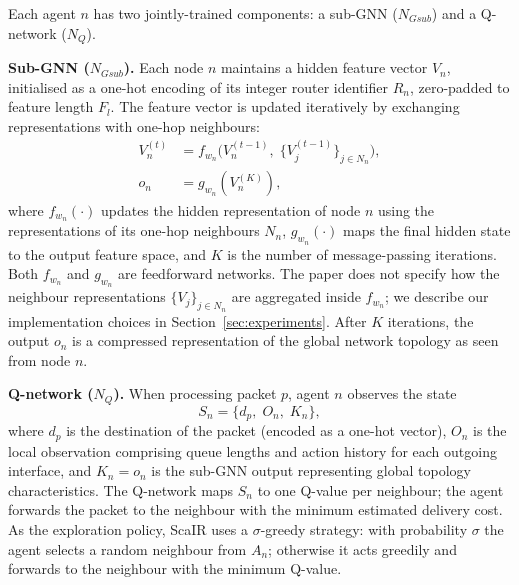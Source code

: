 \documentclass[10pt,twocolumn,letterpaper]{article}
\begin{document}
Each agent $n$ has two jointly-trained components: a sub-GNN
($N_{Gsub}$) and a Q-network ($N_Q$).

\textbf{Sub-GNN ($N_{Gsub}$).} Each node $n$ maintains a hidden
feature vector $V_n$, initialised as a one-hot encoding of its integer
router identifier $R_n$, zero-padded to feature length $F_l$. The
feature vector is updated iteratively by exchanging representations
with one-hop neighbours:
\begin{align}
  V_n^{(t)} &= f_{w_n}\!\bigl(
    V_n^{(t-1)},\;\{V_j^{(t-1)}\}_{j \in N_n}
  \bigr), \label{eq:gnn} \\
  o_n &= g_{w_n}(V_n^{(K)}), \label{eq:out}
\end{align}
where $f_{w_n}(\cdot)$ updates the hidden representation of node $n$
using the representations of its one-hop neighbours $N_n$,
$g_{w_n}(\cdot)$ maps the final hidden state to the output feature
space, and $K$ is the number of message-passing iterations. Both
$f_{w_n}$ and $g_{w_n}$ are feedforward networks. The paper does not
specify how the neighbour representations $\{V_j\}_{j \in N_n}$ are
aggregated inside $f_{w_n}$; we describe our implementation choices in
Section~\ref{sec:experiments}. After $K$ iterations, the output $o_n$
is a compressed representation of the global network topology as seen
from node $n$.

\textbf{Q-network ($N_Q$).} When processing packet $p$, agent $n$
observes the state
\begin{equation}
  S_n = \{d_p,\; O_n,\; K_n\},
  \label{eq:state}
\end{equation}
where $d_p$ is the destination of the packet (encoded as a one-hot
vector), $O_n$ is the local observation comprising queue lengths and
action history for each outgoing interface, and $K_n = o_n$ is the
sub-GNN output representing global topology characteristics. The
Q-network maps $S_n$ to one Q-value per neighbour; the agent forwards
the packet to the neighbour with the minimum estimated delivery cost.
As the exploration policy, ScaIR uses a $\sigma$-greedy strategy: with
probability $\sigma$ the agent selects a random neighbour from $A_n$;
otherwise it acts greedily and forwards to the neighbour with the
minimum Q-value.
\end{document}
